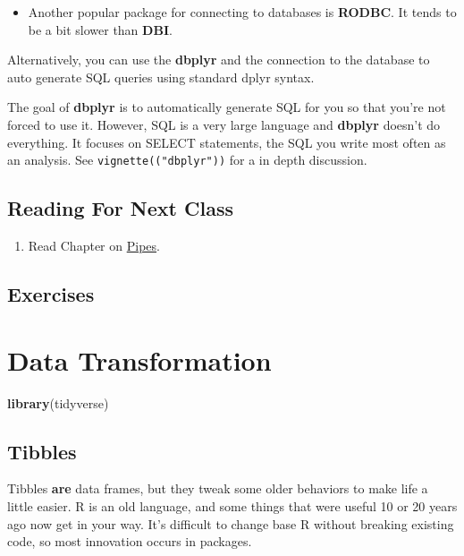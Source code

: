 \documentclass[]{book}
\newenvironment{Shaded}{\begin{snugshade}}{\end{snugshade}}
\newcommand{\KeywordTok}[1]{\textcolor[rgb]{0.13,0.29,0.53}{\textbf{#1}}}
\newcommand{\NormalTok}[1]{#1}
\providecommand{\tightlist}{%
  \setlength{\itemsep}{0pt}\setlength{\parskip}{0pt}}
\newenvironment{rmdblock}[1]
  {\begin{shaded*}
  \begin{itemize}
  \renewcommand{\labelitemi}{
    \raisebox{-.7\height}[0pt][0pt]{
      {\setkeys{Gin}{width=3em,keepaspectratio}\texttt{[image: images/\#1]}}
    }
  }
  \item
  }
  {
  \end{itemize}
  \end{shaded*}
  }
\newenvironment{rmdnote}
  {\begin{rmdblock}{note}}
  {\end{rmdblock}}
\begin{document}
\begin{rmdnote}
Another popular package for connecting to databases is \textbf{RODBC}.
It tends to be a bit slower than \textbf{DBI}.
\end{rmdnote}

Alternatively, you can use the \textbf{dbplyr} and the connection to the
database to auto generate SQL queries using standard dplyr syntax.

The goal of \textbf{dbplyr} is to automatically generate SQL for you so
that you're not forced to use it. However, SQL is a very large language
and \textbf{dbplyr} doesn't do everything. It focuses on SELECT
statements, the SQL you write most often as an analysis. See
\texttt{vignette(("dbplyr"))} for a in depth discussion.

\section{Reading For Next Class}\label{reading-for-next-class-2}

\begin{enumerate}
\def\labelenumi{\arabic{enumi}.}
\tightlist
\item
  Read Chapter on \href{http://r4ds.had.co.nz/pipes.html}{Pipes}.
\end{enumerate}

\section{Exercises}\label{exercises-2}

\chapter{Data Transformation}\label{data-transformation}

\begin{Shaded}
\begin{Highlighting}[]
\KeywordTok{library}\NormalTok{(tidyverse)}
\end{Highlighting}
\end{Shaded}

\section{Tibbles}\label{tibbles}

Tibbles \textbf{are} data frames, but they tweak some older behaviors to
make life a little easier. R is an old language, and some things that
were useful 10 or 20 years ago now get in your way. It's difficult to
change base R without breaking existing code, so most innovation occurs
in packages.
\end{document}
